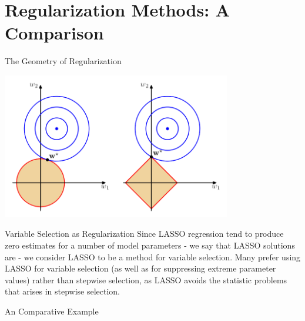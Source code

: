 \documentclass[12pt,t]{beamer}
\let\emph\relax %
\begin{document}
\section{Regularization Methods: A Comparison}

\begin{frame}{The Geometry of Regularization} 
\begin{center}
\includegraphics[width=100mm]{lecture5_g1}
\end{center}
\end{frame}

\begin{frame}{Variable Selection as Regularization} 
Since LASSO regression tend to produce zero estimates for a number of model parameters - we say that LASSO solutions are \emph{sparse} - we consider LASSO to be a method for variable selection.
\vskip0.4cm
Many prefer using LASSO for variable selection (as well as for suppressing extreme parameter values) rather than stepwise selection, as LASSO avoids the statistic problems that arises in stepwise selection.
\end{frame}

\begin{frame}{An Comparative Example} 

\end{frame}
\end{document}
